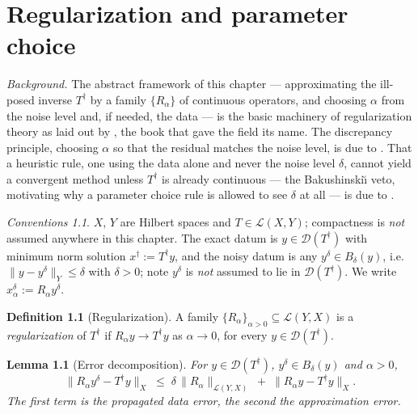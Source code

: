 \documentclass[a4paper]{report}
\theoremstyle{plain}
\newtheorem{lemma}[theorem]{Lemma}
\theoremstyle{definition}
\newtheorem{definition}[theorem]{Definition}
\theoremstyle{remark}
\newtheorem{assumptions}[theorem]{Conventions}
\newcommand{\Ll}{\mathcal{L}}
\newcommand{\Dom}{\mathcal{D}}
\newcommand{\dg}{^{\dagger}}
\begin{document}
\chapter{Regularization and parameter choice}
\label{ch_13_regularization}

\noindent\emph{Background.} The abstract framework of this chapter --- approximating the
ill-posed inverse $T\dg$ by a family $\{R_{\alpha}\}$ of continuous operators, and
choosing $\alpha$ from the noise level and, if needed, the data --- is the basic
machinery of regularization theory as laid out by \citet{TikhonovArsenin1977}, the book
that gave the field its name. The discrepancy principle, choosing $\alpha$ so that the
residual matches the noise level, is due to \citet{Morozov1966}. That a heuristic rule,
one using the data alone and never the noise level $\delta$, cannot yield a convergent
method unless $T\dg$ is already continuous --- the Bakushinski\u{\i} veto, motivating why
a parameter choice rule is allowed to see $\delta$ at all --- is due to
\citet{Bakushinskii1985}.

\begin{assumptions}
  \label{asm_regularization_parameter_choice}
  $X$, $Y$ are Hilbert spaces and $T \in \Ll(X,Y)$;
compactness is \emph{not} assumed anywhere in this chapter.  The exact datum is
$y \in \Dom(T\dg)$ with minimum norm solution $x\dg := T\dg y$, and the noisy datum is any
$y^{\delta} \in B_{\delta}(y)$, i.e.\ $\|y - y^{\delta}\|_Y \le \delta$ with
$\delta > 0$; note $y^{\delta}$ is \emph{not} assumed to lie in $\Dom(T\dg)$.  We write
$x^{\delta}_{\alpha} := R_{\alpha} y^{\delta}$.
\end{assumptions}

\begin{definition}[Regularization]
  \label{def_regularization}
  A family $\{R_{\alpha}\}_{\alpha > 0} \subseteq \Ll(Y,X)$ is a \emph{regularization} of
  $T\dg$ if $R_{\alpha} y \to T\dg y$ as $\alpha \to 0$, for every $y \in \Dom(T\dg)$.
\end{definition}


\begin{lemma}[Error decomposition]
  \label{lem_error_decomposition}
  For $y \in \Dom(T\dg)$, $y^{\delta} \in B_{\delta}(y)$ and $\alpha > 0$,
  \[
    \|R_{\alpha} y^{\delta} - T\dg y\|_X
      \;\le\; \delta\,\|R_{\alpha}\|_{\Ll(Y,X)} \;+\; \|R_{\alpha} y - T\dg y\|_X .
  \]
  The first term is the \emph{propagated data error}, the second the
  \emph{approximation error}.
\end{lemma}
\end{document}
